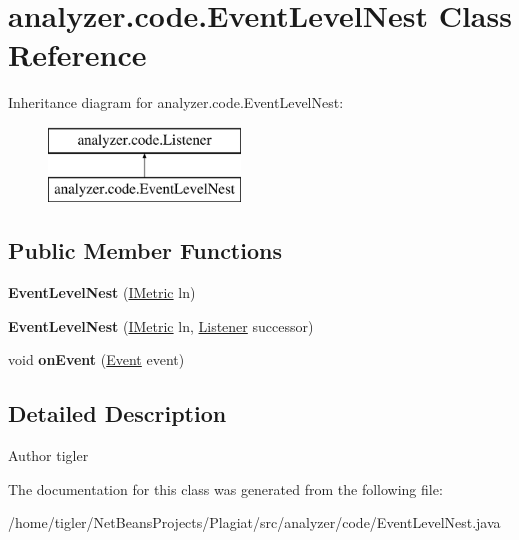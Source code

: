 \hypertarget{classanalyzer_1_1code_1_1EventLevelNest}{}\section{analyzer.\+code.\+Event\+Level\+Nest Class Reference}
\label{classanalyzer_1_1code_1_1EventLevelNest}
Inheritance diagram for analyzer.\+code.\+Event\+Level\+Nest\+:\begin{figure}[H]
\begin{center}
\leavevmode
\includegraphics[height=2.000000cm]{classanalyzer_1_1code_1_1EventLevelNest}
\end{center}
\end{figure}
\subsection*{Public Member Functions}
\begin{DoxyCompactItemize}
\item 
\mbox{\label{classanalyzer_1_1code_1_1EventLevelNest_a9958fcecfabb6bde976c193145089c04}} 
{\bfseries Event\+Level\+Nest} (\hyperlink{interfaceanalyzer_1_1code_1_1IMetric}{I\+Metric} ln)
\item 
\mbox{\label{classanalyzer_1_1code_1_1EventLevelNest_a4544f1e67e498e0d913aaf1b663a4d3c}} 
{\bfseries Event\+Level\+Nest} (\hyperlink{interfaceanalyzer_1_1code_1_1IMetric}{I\+Metric} ln, \hyperlink{classanalyzer_1_1code_1_1Listener}{Listener} successor)
\item 
\mbox{\label{classanalyzer_1_1code_1_1EventLevelNest_a4f22be2013be45803dbb7fb3f5f06c7b}} 
void {\bfseries on\+Event} (\hyperlink{classanalyzer_1_1code_1_1Event}{Event} event)
\end{DoxyCompactItemize}


\subsection{Detailed Description}
\begin{DoxyAuthor}{Author}
tigler 
\end{DoxyAuthor}


The documentation for this class was generated from the following file\+:\begin{DoxyCompactItemize}
\item 
/home/tigler/\+Net\+Beans\+Projects/\+Plagiat/src/analyzer/code/Event\+Level\+Nest.\+java\end{DoxyCompactItemize}
